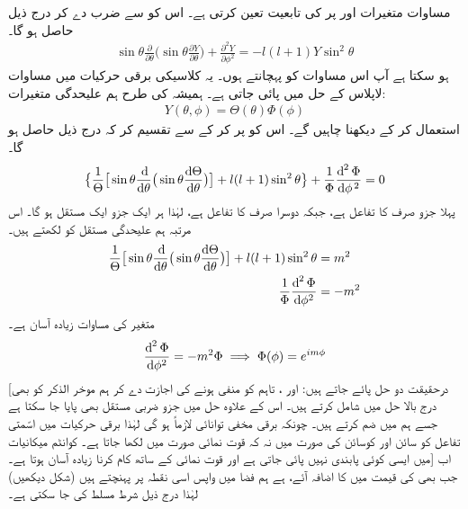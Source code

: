 مساوات  متغیرات     اور      پر   کی تابعیت  تعین کرتی ہے۔
اس کو     سے ضرب دے کر درج ذیل حاصل ہو گا۔
\begin{align}
\sin{\theta}\frac{\partial}{\partial{\theta}}\big(\sin{\theta}\frac{\partial{Y}}{\partial{\theta}}\big)+\frac{\partial^{2}{Y}}{\partial{\phi^{2}}}=-l(l+1)Y\sin^{2}{\theta} 
\end{align}
ہو سکتا ہے آپ اس مساوات کو پہچانتے ہوں۔ یہ کلاسیکی برقی حرکیات میں مساوات لاپلاس کے حل میں پائی جاتی ہے۔ ہمیشہ کی طرح ہم علیحدگی متغیرات:
\begin{align}
Y(\theta,\phi)=\Theta(\theta)\Phi(\phi) 
\end{align}
استعمال کر کے دیکھنا چاہیں گے۔ اس کو پر کر کے  سے تقسیم کر کہ درج ذیل حاصل ہو گا۔ 
\begin{align*}
\big\{\frac{1}{\Theta}\big[\sin{\theta}\frac{\dif}{\dif\theta}\big(\sin\theta\frac{\dif{\Theta}}{\dif{\theta}}\big)\big]+l(l+1)\sin^{2}{\theta}\big\}+\frac{1}{\Phi}\frac{\dif^{\,2}{\Phi}}{\dif{\phi^{\,2}}}=0 
\end{align*}
پہلا جزو صرف     کا تفاعل ہے، جبکہ دوسرا صرف        کا تفاعل ہے، لہٰذا ہر ایک جزو ایک مستقل ہو گا۔ اس مرتبہ ہم علیحدگی مستقل کو     لکھتے ہیں۔
\begin{align}
\frac{1}{\Theta}\big[\sin{\theta}\frac{\dif}{\dif\theta}\big(\sin\theta\frac{\dif{\Theta}}{\dif{\theta}}\big)\big]+l(l+1)\sin^{2}{\theta}&=m^{2} \\
\frac{1}{\Phi}\frac{\dif^{\,2}{\Phi}}{\dif{\phi^{2}}}&=-m^{2} 
\end{align}
 متغیر   کی مساوات زیادہ آسان ہے۔
 \begin{align}
\frac{\dif^{\,2}{\Phi}}{\dif{\phi^{2}}}=-m^{2}\Phi\implies \Phi(\phi)=e^{im\phi} 
\end{align}
[درحقیقت  دو حل پائے جاتے ہیں:  اور ، تاہم  کو منفی ہونے کی اجازت دے کر ہم موخر الذکر کو بھی درج بالا حل میں شامل کرتے ہیں۔ اس کے علاوہ حل میں  جزو ضربی مستقل بھی پایا جا  سکتا ہے جسے ہم     میں ضم کرتے ہیں۔ چونکہ برقی مخفی توانائی لازماً  ہو گی لہٰذا برقی حرکیات میں اسّمتی تفاعل     کو سائن اور کوسائن کی صورت میں نہ کہ قوت نمائی صورت میں لکھا جاتا ہے۔ کوانٹم میکانیات میں ایسی کوئی پابندی نہیں پائی جاتی ہے اور قوت نمائی کے ساتھ کام کرنا زیادہ آسان ہوتا ہے۔] اب جب بھی     کی قیمت  میں   کا اضافہ آئے، ہے ہم فضا میں واپس اسی نقطہ پر پہنچتے ہیں (شکل  دیکھیں) لہٰذا درج ذیل شرط مسلط کی جا سکتی ہے۔
